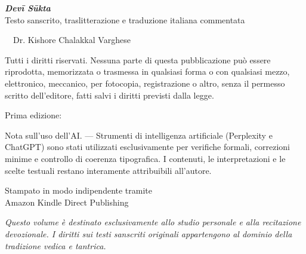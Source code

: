 
\clearpage
\thispagestyle{empty}
\vspace*{\fill}

{\small
  \noindent\textbf{\textit{Devī Sūkta}}\\
  Testo sanscrito, traslitterazione e traduzione italiana commentata

  \medskip
  \noindent\textcopyright\ \the\year\ Dr. Kishore Chalakkal Varghese
  
  \vspace{0.5em}
  
  \medskip
  \noindent Tutti i diritti riservati. Nessuna parte di questa pubblicazione
  può essere riprodotta, memorizzata o trasmessa in qualsiasi forma o con
  qualsiasi mezzo, elettronico, meccanico, per fotocopia, registrazione o altro,
  senza il permesso scritto dell’editore, fatti salvi i diritti previsti dalla legge.

  \medskip
  \noindent Prima edizione: \the\year

  \medskip
  \noindent Nota sull’uso dell’AI. — Strumenti di intelligenza artificiale (Perplexity e ChatGPT) sono stati utilizzati esclusivamente per verifiche formali, correzioni minime e controllo di coerenza tipografica. I contenuti, le interpretazioni e le scelte testuali restano interamente attribuibili all’autore.


  \medskip
  \noindent Stampato in modo indipendente tramite\\
  Amazon Kindle Direct Publishing

  \medskip
  \noindent \textit{Questo volume è destinato esclusivamente allo studio personale e
  alla recitazione devozionale. I diritti sui testi sanscriti originali appartengono
  al dominio della tradizione vedica e tantrica.}
}

\vspace*{\fill}
